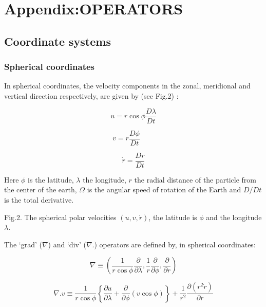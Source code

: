 
\section{Appendix:OPERATORS}

\subsection{Coordinate systems}

\subsubsection{Spherical coordinates}

In spherical coordinates, the velocity components in the zonal, meridional
and vertical direction respectively, are given by (see Fig.2) :

\[
u=r\cos \phi \frac{D\lambda }{Dt} 
\]

\[
v=r\frac{D\phi }{Dt}\qquad 
\]
$\qquad \qquad \qquad \qquad $

\[
\dot{r}=\frac{Dr}{Dt} 
\]

Here $\phi $ is the latitude, $\lambda $ the longitude, $r$ the radial
distance of the particle from the center of the earth, $\Omega $ is the
angular speed of rotation of the Earth and $D/Dt$ is the total derivative.

Fig.2. The spherical polar velocities $(u,v,\dot{r})$, the latitude is $\phi 
$ and the longitude $\lambda $.

The `grad' ($\nabla $) and `div' ($\nabla $.) operators are defined by, in
spherical coordinates:

\[
\nabla \equiv \left( \frac{1}{r\cos \phi }\frac{\partial }{\partial \lambda }%
,\frac{1}{r}\frac{\partial }{\partial \phi },\frac{\partial }{\partial r}%
\right) 
\]

\[
\nabla .v\equiv \frac{1}{r\cos \phi }\left\{ \frac{\partial u}{\partial
\lambda }+\frac{\partial }{\partial \phi }\left( v\cos \phi \right) \right\}
+\frac{1}{r^{2}}\frac{\partial \left( r^{2}\dot{r}\right) }{\partial r} 
\]
